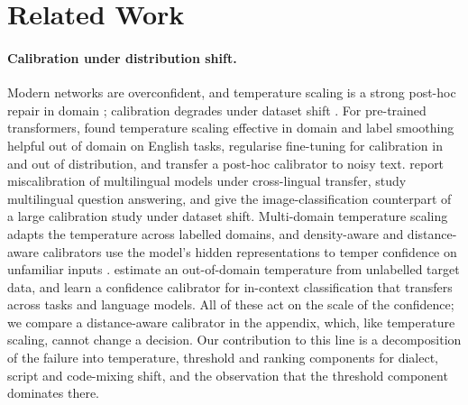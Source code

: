 \section{Related Work}
\label{sec:related-work}

\paragraph{Calibration under distribution shift.}
Modern networks are overconfident, and temperature scaling is a strong post-hoc repair in domain
\citep{guo2017calibration}; calibration degrades under dataset shift \citep{ovadia2019trust}. For pre-trained
transformers, \citet{desai2020calibration} found temperature scaling effective in domain and label smoothing helpful
out of domain on English tasks, \citet{kong2020calibrated} regularise fine-tuning for calibration in and out of
distribution, and \citet{zhang2023transferable} transfer a post-hoc calibrator to noisy text.
\citet{ahuja2022multilingual} report miscalibration of multilingual models under cross-lingual transfer,
\citet{yang2026multilingualqa} study multilingual question answering, and \citet{roschewitz2025where} give the
image-classification counterpart of a large calibration study under dataset shift. Multi-domain temperature scaling
\citep{yu2022robust} adapts the temperature across labelled domains, and density-aware and distance-aware calibrators
use the model's hidden representations to temper confidence on unfamiliar inputs \citep{tomani2023density,
gasparin2024distance}. \citet{wang2026posthoc} estimate an out-of-domain temperature from unlabelled target data, and
\citet{dhar2026universal} learn a confidence calibrator for in-context classification that transfers across tasks and
language models. All of these act on the scale of the confidence; we compare a distance-aware calibrator in the
appendix, which, like temperature scaling, cannot change a decision. Our contribution to this line is
a decomposition of the failure into temperature, threshold and ranking components for dialect, script and code-mixing
shift, and the observation that the threshold component dominates there.

